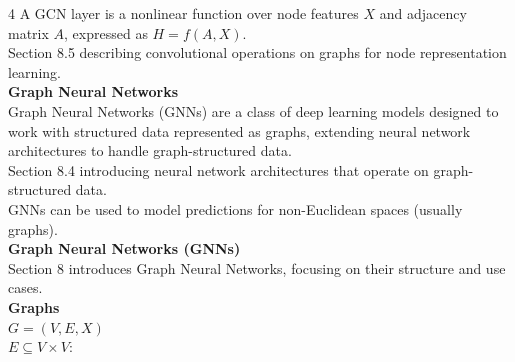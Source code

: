 \documentclass[8pt]{extarticle}
\begin{document}
\begin{multicols}{4}
A GCN layer is a nonlinear function over node features $X$ and adjacency matrix $ A$, expressed as $ H = f(A, X)$.\\
Section 8.5 describing convolutional operations on graphs for node representation learning.\\
\vspace{2pt}\textbf{Graph Neural Networks}\\
Graph Neural Networks (GNNs) are a class of deep learning models designed to work with structured data represented as graphs, extending neural network architectures to handle graph-structured data.\\
Section 8.4 introducing neural network architectures that operate on graph-structured data.\\
GNNs can be used to model predictions for non-Euclidean spaces (usually graphs).\\
\vspace{2pt}\textbf{Graph Neural Networks (GNNs)}\\
Section 8 introduces Graph Neural Networks, focusing on their structure and use cases.\\
\vspace{2pt}\textbf{Graphs}\\
$G = (V, E, X)$\\
$E \subseteq V \times V$\Graph:


\end{multicols}
\end{document}
